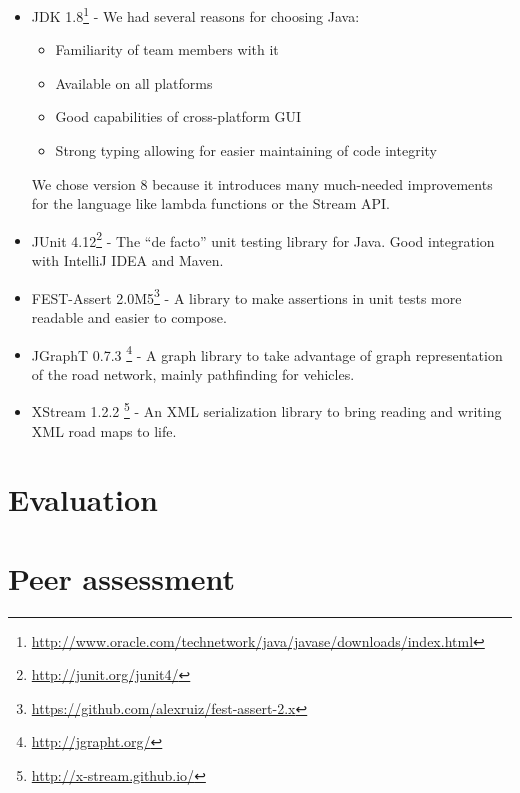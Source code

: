 \documentclass[a4paper,12pt]{article}
\begin{document}
\begin{itemize}
	\item JDK 1.8\footnote{\url{http://www.oracle.com/technetwork/java/javase/downloads/index.html}} - We had several reasons for choosing Java: \begin{itemize}
		\item Familiarity of team members with it
		\item Available on all platforms
		\item Good capabilities of cross-platform GUI
		\item Strong typing allowing for easier maintaining of code integrity
	\end{itemize}
	We chose version 8 because it introduces many much-needed improvements for the language like lambda functions or the Stream API.
	\item JUnit 4.12\footnote{\url{http://junit.org/junit4/}} - The ``de facto'' unit testing library for Java. Good integration with IntelliJ IDEA and Maven.
	\item FEST-Assert 2.0M5\footnote{\url{https://github.com/alexruiz/fest-assert-2.x}} - A library to make assertions in unit tests more readable and easier to compose.
	\item JGraphT 0.7.3 \footnote{\url{http://jgrapht.org/}} - A graph library to take advantage of graph representation of the road network, mainly pathfinding for vehicles.
	\item XStream 1.2.2 \footnote{\url{http://x-stream.github.io/}} - An XML serialization library to bring reading and writing XML road maps to life.
\end{itemize}



\section{Evaluation}

\section{Peer assessment}
\end{document}

